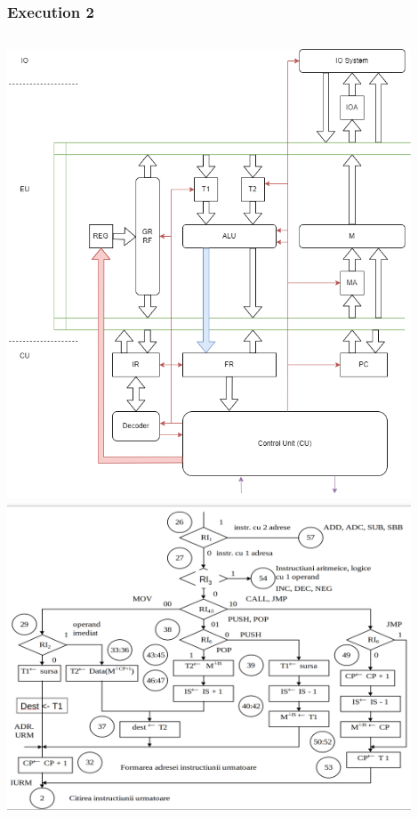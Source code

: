 \begin{frame}
\frametitle{Execution 2}
\begin{columns}
\includegraphics[width=0.9\textwidth]{media/architecture.png}
\includegraphics[width=0.9\textwidth]{media/cdtree2.png}
\end{columns}
\end{frame}



